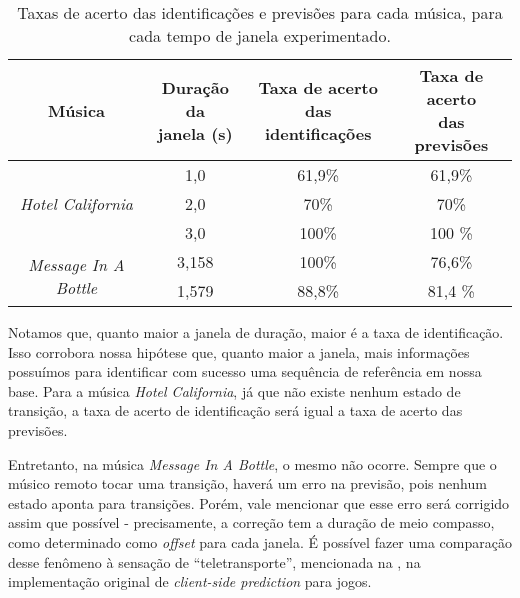 \begin{table}[ht!]
    \centering
    \begin{tabular}{|c|c|c|c|}
        \hline
        Música & \makecell{Duração da \\ janela (s)} & \makecell{Taxa de acerto \\ das identificações} & \makecell{Taxa de acerto \\ das previsões}\\
        
        \hline
        \hline
        
        \multirow{3}{5em}{\centering \textit{Hotel California}} & 1,0 & 61,9\% & 61,9\% \\ 
        \cline{2-4}
        
        & 2,0 & 70\% & 70\% \\ 
        \cline{2-4}
        
        & 3,0 & 100\% & 100 \% \\ 
        
        \hline
        
        \multirow{2}{5em}{\centering \textit{Message In A Bottle}} & 3,158 & 100\% & 76,6\% \\ 
        \cline{2-4}
        
        & 1,579 & 88,8\% & 81,4 \% \\ 
        \cline{2-4}
        
        \hline
    \end{tabular}
    \caption{Taxas de acerto das identificações e previsões para cada música, para cada tempo de janela experimentado.}
    \label{tab:dtw_results_correctness}
\end{table}

Notamos que, quanto maior a janela de duração, maior é a taxa de identificação. Isso corrobora nossa hipótese que, quanto maior a janela, mais informações possuímos para identificar com sucesso uma sequência de referência em nossa base. Para a música \textit{Hotel California}, já que não existe nenhum estado de transição, a taxa de acerto de identificação será igual a taxa de acerto das previsões.

Entretanto, na música \textit{Message In A Bottle}, o mesmo não ocorre. Sempre que o músico remoto tocar uma transição, haverá um erro na previsão, pois nenhum estado aponta para transições. Porém, vale mencionar que esse erro será corrigido assim que possível - precisamente, a correção tem a duração de meio compasso, como determinado como \textit{offset} para cada janela. É possível fazer uma comparação desse fenômeno à sensação de ``teletransporte'', mencionada na , na implementação original de \textit{client-side prediction} para jogos.

